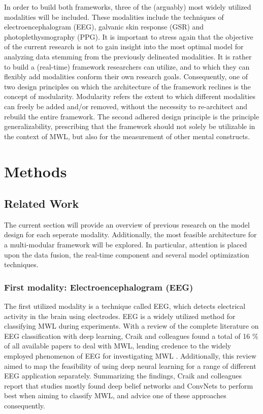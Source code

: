 \documentclass{article}
\begin{document}
In order to build both frameworks, three of the (arguably) most widely utilized modalities will be included. These modalities include the techniques of electroencephalogram (EEG), galvanic skin response (GSR) and photoplethysmography (PPG). It is important to stress again that the objective of the current research is not to gain insight into the most optimal model for analyzing data stemming from the previously delineated modalities. It is rather to build a (real-time) framework researchers can utilize, and to which they can flexibly add modalities conform their own research goals. Consequently, one of two design principles on which the architecture of the framework reclines is the concept of modularity. Modularity refers the extent to which different modalities can freely be added and/or removed, without the necessity to re-architect and rebuild the entire framework. The second adhered design principle is the principle generalizability, prescribing that the framework should not solely be utilizable in the context of MWL, but also for the measurement of other mental constructs.

\newpage
\section{Methods}

\subsection{Related Work} \label{Relatedwork}
The current section will provide an overview of previous research on the model design for each seperate modality. Additionally,  the most feasible architecture for a multi-modular framework will be explored. In particular, attention is placed upon the data fusion, the real-time component and several model optimization techniques.

\subsubsection{First modality: Electroencephalogram (EEG)}
The first utilized modality is a technique  called EEG, which detects electrical activity in the brain using electrodes. EEG is a widely utilized method for classifying MWL during experiments. With a review of the complete literature on EEG classification with deep learning, Craik and colleagues found a total of 16 \% of all available papers to deal with MWL, lending credence to the widely employed phenomenon of EEG for investigating MWL \cite{craik2019deep}. Additionally, this review aimed to map the feasibility of using deep neural learning for a range of different EEG application separately. Summarizing the findings, Craik and colleagues report that studies mostly found deep belief networks and ConvNets to perform best when aiming to classify MWL, and advice one of these approaches consequently.\cite{craik2019deep} 
\end{document}
